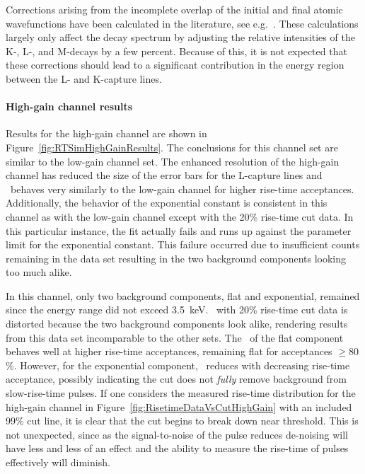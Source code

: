 Corrections arising from the incomplete overlap of the initial and final atomic
wavefunctions have been calculated in the literature, see e.g.~\cite{Bah63}.
These calculations largely only affect the decay spectrum by adjusting the relative
intensities of the K-, L-, and M-decays by a few percent.  Because of this, it is not expected that these
corrections should lead to a significant contribution in the energy region between the L- and K-capture lines. 

					\paragraph{High-gain channel results}

Results for the high-gain channel are shown in
Figure~\ref{fig:RTSimHighGainResults}. The conclusions for this channel set are
similar to the low-gain channel set.  The enhanced resolution of the
high-gain channel has reduced the size of the error bars for the L-capture
lines and \releff~behaves very similarly to the low-gain channel for higher
rise-time acceptances.  Additionally, the behavior of the exponential constant
is consistent in this channel as with the low-gain channel except with the 20\%
rise-time cut data.  In this particular instance, the fit actually fails and
runs up against the parameter limit for the exponential constant.  This failure
occurred due to insufficient counts remaining in the data set resulting in the
two background components looking too much alike.

In this channel, only two background components, flat and exponential, remained since the energy range did not exceed 3.5~keV.  \releff~with 20\% rise-time cut data is distorted because the two background components look alike, rendering results from this data set incomparable to the other sets.  The \releff~of the flat component behaves well at higher rise-time acceptances, remaining flat for acceptances $\ge80$\%.  However, for the exponential component, \releff~reduces with decreasing rise-time acceptance, possibly indicating the cut does not \emph{fully} remove background from slow-rise-time pulses.  If one considers the measured rise-time distribution for the high-gain channel in Figure~\ref{fig:RisetimeDataVsCutHighGain} with an included 99\% cut line, it is clear that the cut begins to break down near threshold.  
This is not unexpected, since as the signal-to-noise of the pulse reduces de-noising will have less and less of an effect and the ability to measure the rise-time of pulses effectively will diminish.

